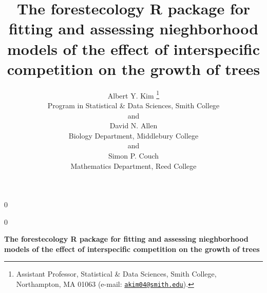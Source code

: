 \documentclass[12pt]{article}
\newcommand{\blind}{0}
\begin{document}
\def\spacingset#1{\renewcommand{\baselinestretch}%
{#1}\small\normalsize} \spacingset{1}



\blind
{
  \title{\bf The forestecology R package for fitting and assessing nieghborhood
models of the effect of interspecific competition on the growth of trees}

  \author{
        Albert Y. Kim \thanks{Assistant Professor, Statistical \& Data Sciences, Smith College,
Northampton, MA 01063 (e-mail:
\href{mailto:akim04@smith.edu}{\nolinkurl{akim04@smith.edu}}).} \\
    Program in Statistical \& Data Sciences, Smith College\\
     and \\     David N. Allen \\
    Biology Department, Middlebury College\\
     and \\     Simon P. Couch \\
    Mathematics Department, Reed College\\
      }
  \maketitle
} \fi

\blind
{
  \bigskip
  \bigskip
  \bigskip
  \begin{center}
    {\LARGE\bf The forestecology R package for fitting and assessing nieghborhood
models of the effect of interspecific competition on the growth of trees}
  \end{center}
  \medskip
} \fi
\end{document}
